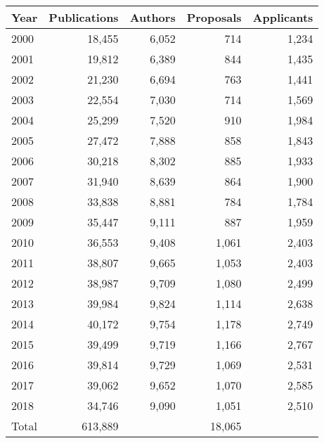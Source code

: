 \begin{tabular}{lrrrr}
\toprule
Year & Publications & Authors & Proposals & Applicants\\
\midrule
2000 & 18,455 & 6,052 & 714 & 1,234\\
2001 & 19,812 & 6,389 & 844 & 1,435\\
2002 & 21,230 & 6,694 & 763 & 1,441\\
2003 & 22,554 & 7,030 & 714 & 1,569\\
2004 & 25,299 & 7,520 & 910 & 1,984\\
2005 & 27,472 & 7,888 & 858 & 1,843\\
2006 & 30,218 & 8,302 & 885 & 1,933\\
2007 & 31,940 & 8,639 & 864 & 1,900\\
2008 & 33,838 & 8,881 & 784 & 1,784\\
2009 & 35,447 & 9,111 & 887 & 1,959\\
2010 & 36,553 & 9,408 & 1,061 & 2,403\\
2011 & 38,807 & 9,665 & 1,053 & 2,403\\
2012 & 38,987 & 9,709 & 1,080 & 2,499\\
2013 & 39,984 & 9,824 & 1,114 & 2,638\\
2014 & 40,172 & 9,754 & 1,178 & 2,749\\
2015 & 39,499 & 9,719 & 1,166 & 2,767\\
2016 & 39,814 & 9,729 & 1,069 & 2,531\\
2017 & 39,062 & 9,652 & 1,070 & 2,585\\
2018 & 34,746 & 9,090 & 1,051 & 2,510\\
\midrule
Total & 613,889 & & 18,065 & \\
\bottomrule
\end{tabular}
